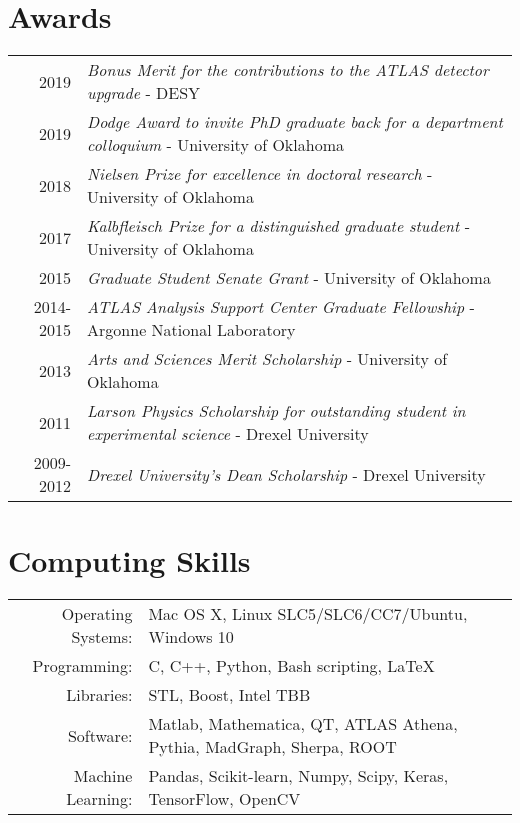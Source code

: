 \documentclass[a4paper,10pt]{article}
\begin{document}
\vspace{3mm}
\section{Awards}

\begin{tabular}{rp{15.5cm}}
\textsc{2019}       & {\em Bonus Merit for the contributions to the ATLAS detector upgrade} - DESY\\
\textsc{2019}       & {\em Dodge Award to invite PhD graduate back for a department colloquium} - University of Oklahoma\\
\textsc{2018}       & {\em Nielsen Prize for excellence in doctoral research} - University of Oklahoma\\
\textsc{2017}       & {\em Kalbfleisch Prize for a distinguished graduate student} - University of Oklahoma\\
\textsc{2015}       & {\em Graduate Student Senate Grant} - University of Oklahoma\\
\textsc{2014-2015}    & {\em ATLAS Analysis Support Center Graduate Fellowship} - Argonne National Laboratory\\
\textsc{2013}       & {\em Arts and Sciences Merit Scholarship} - University of Oklahoma\\
\textsc{2011}       & {\em Larson Physics Scholarship for outstanding student in experimental science} - Drexel University\\
\textsc{2009-2012}    & {\em Drexel University's Dean Scholarship} - Drexel University\\
\end{tabular}


\vspace{3mm}
\section{Computing Skills}
\begin{tabular}{rl}
Operating Systems:  & Mac OS X, Linux SLC5/SLC6/CC7/Ubuntu, Windows 10  \\
Programming:    & C, C++, Python, Bash scripting, \LaTeX        \\
Libraries:          & STL, Boost, Intel TBB \\
Software:           & Matlab, Mathematica, QT, ATLAS Athena, Pythia, MadGraph, Sherpa, ROOT   \\
Machine Learning:   & Pandas, Scikit-learn, Numpy, Scipy, Keras, TensorFlow, OpenCV     \\
\end{tabular}
\end{document}
